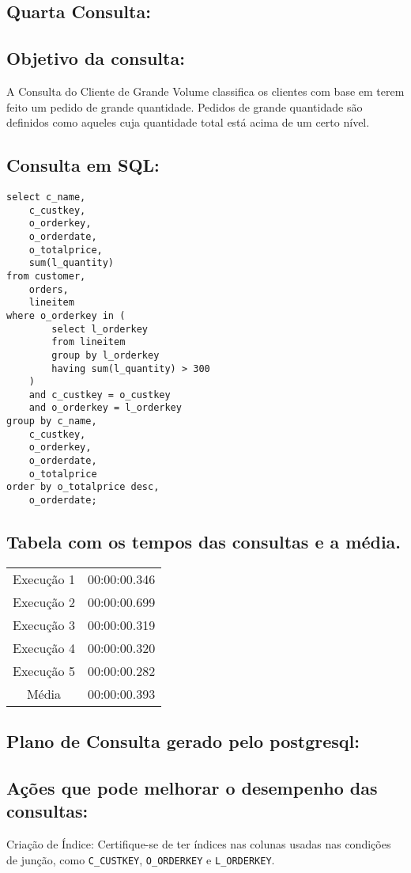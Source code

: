 \documentclass[12pt]{article}
\begin{document}
\begin{landscape}
\section{Quarta Consulta:}


\subsection{Objetivo da consulta:}
A Consulta do Cliente de Grande Volume classifica os clientes com base em terem feito um pedido de grande quantidade. Pedidos de grande quantidade são definidos como aqueles cuja quantidade total está acima de um certo nível.

\subsection{Consulta em SQL:}
\begin{lstlisting}
select c_name,
	c_custkey,
	o_orderkey,
	o_orderdate,
	o_totalprice,
	sum(l_quantity)
from customer,
	orders,
	lineitem
where o_orderkey in (
		select l_orderkey
		from lineitem
		group by l_orderkey
		having sum(l_quantity) > 300
	)
	and c_custkey = o_custkey
	and o_orderkey = l_orderkey
group by c_name,
	c_custkey,
	o_orderkey,
	o_orderdate,
	o_totalprice
order by o_totalprice desc,
	o_orderdate;
\end{lstlisting}

\subsection{Tabela com os tempos das consultas e a média.}
\begin{tabular}{|c|c|}
  \hline
  Execução 1 & 00:00:00.346 \\
  Execução 2 & 00:00:00.699 \\
  Execução 3 & 00:00:00.319 \\
  Execução 4 & 00:00:00.320 \\
  Execução 5 & 00:00:00.282 \\
  \hline
  Média & 00:00:00.393 \\
  \hline
\end{tabular}
\subsection{Plano de Consulta gerado pelo postgresql:}

\subsection{Ações que pode melhorar o desempenho das 
consultas:} Criação de Índice: Certifique-se de ter índices nas colunas usadas nas condições de junção, como \texttt{C\_CUSTKEY}, \texttt{O\_ORDERKEY} e \texttt{L\_ORDERKEY}.

\end{landscape}
\end{document}
